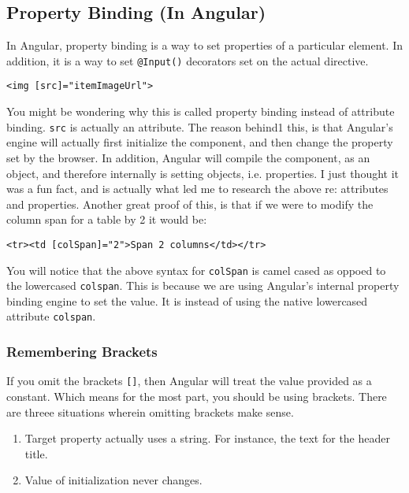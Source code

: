 \subsection{ Property Binding (In Angular) }
In Angular, property binding is a way to set properties of a particular 
element. In addition, it is a way to set \lstinline{@Input()} decorators set 
on the actual directive. 

\begin{lstlisting}
<img [src]="itemImageUrl">
\end{lstlisting}

You might be wondering why this is called property binding instead of 
attribute binding. \lstinline{src} is actually an attribute. The reason behind1
this, is that Angular's engine will actually first initialize the component, 
and then change the property set by the browser. In addition, Angular will 
compile the component, as an object, and therefore internally is setting 
objects, i.e. properties. I just thought it was a fun fact, and is actually 
what led me to research the above re: attributes and properties. Another great
proof of this, is that if we were to modify the column span for a table by 2
it would be: 
\begin{lstlisting}
<tr><td [colSpan]="2">Span 2 columns</td></tr>
\end{lstlisting}

You will notice that the above syntax for \lstinline{colSpan} is camel cased 
as oppoed to the lowercased \lstinline{colspan}. This is because we are using
Angular's internal property binding engine to set the value. It is instead of 
using the native lowercased attribute \lstinline{colspan}. 


\subsubsection{ Remembering Brackets }
If you omit the brackets \lstinline{[]}, then Angular will treat the value
provided as a constant. Which means for the most part, you should be using
brackets. There are threee situations wherein omitting brackets make sense. 
\begin{enumerate}
  \item Target property actually uses a string. For instance, the text for 
  the header title. 
  \item Value of initialization never changes.
\end{enumerate}

